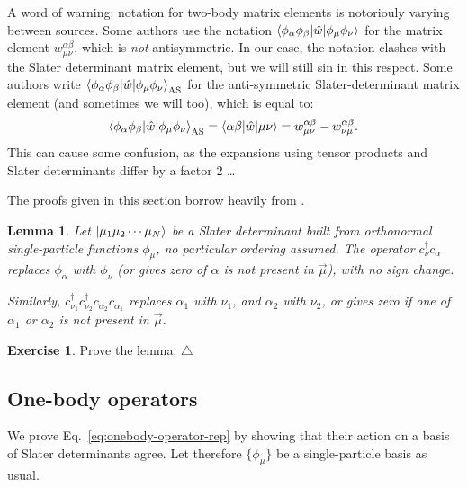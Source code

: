 \documentclass{report}
\theoremstyle{plain}
\newtheorem{lemma}{Lemma}[chapter]
\theoremstyle{definition}
\newtheorem{exerc}{Exercise}[chapter]
\newcommand\xqed[1]{%
  \leavevmode\unskip\penalty9999 \hbox{}\nobreak\hfill
  \quad\hbox{#1}}
\newcommand\demo{\xqed{$\triangle$}}
\newenvironment{exercise}{\bigskip\begin{exerc}}{\demo\end{exerc}\bigskip}
\begin{document}
A word of warning: notation for two-body matrix elements is notoriouly
varying between sources. Some authors use the notation
$\braket{\phi_\alpha\phi_\beta|\hat{w}|\phi_\mu\phi_\nu}$ for the
matrix element $w^{\alpha\beta}_{\mu\nu}$, which is \emph{not}
antisymmetric. In our case, the notation clashes with the Slater
determinant matrix element, but we will still sin in this respect. Some authors write
$\braket{\phi_\alpha\phi_\beta|\hat{w}|\phi_\mu\phi_\nu}_\text{AS}$
for the anti-symmetric Slater-determinant matrix element (and
sometimes we will too), which is
equal to:
\begin{equation}
  \braket{\phi_\alpha\phi_\beta|\hat{w}|\phi_\mu\phi_\nu}_\text{AS} =
  \braket{\alpha\beta|\hat{w}|\mu\nu} = 
  w^{\alpha\beta}_{\mu\nu} - w^{\alpha\beta}_{\nu\mu}. \label{eq:twobody-matelem-as}
\end{equation}
This can cause some confusion, as the expansions using tensor products
and Slater determinants differ by a factor $2$ \ldots

The proofs given in this section borrow heavily from
\cite{HarrisMonkhorstFreeman}.


\begin{lemma}
  Let $\ket{\mu_1\mu_2\cdots\mu_N}$ be a Slater determinant built from
  orthonormal single-particle functions $\phi_\mu$, no
  particular ordering assumed. The
  operator $c^\dag_\nu c_\alpha$ replaces $\phi_\alpha$ with $\phi_\nu$ (or
  gives zero of $\alpha$ is not present in $\vec{\mu}$),  with no sign change. 

  Similarly, $c^\dag_{\nu_1} c^\dag_{\nu_2} c_{\alpha_2} c_{\alpha_1}$
  replaces $\alpha_1$ with $\nu_1$, and $\alpha_2$ with $\nu_2$, or gives
  zero if one of $\alpha_1$ or $\alpha_2$ is not present in $\vec{\mu}$.
\end{lemma}

\begin{exercise}
  Prove the lemma.
\end{exercise}

\subsection{One-body operators}

We prove Eq.~\eqref{eq:onebody-operator-rep} by showing that their
action on a basis of Slater determinants agree. Let therefore
$\{\phi_\mu\}$ be a single-particle basis as usual.
\end{document}

